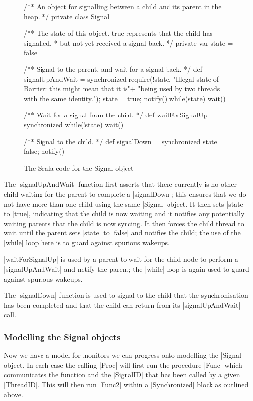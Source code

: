 \begin{figure}[H]
  \begin{scala}
  /** An object for signalling between a child and its parent in the heap. */
  private class Signal{
    /** The state of this object.  true represents that the child has signalled,
      * but not yet received a signal back. */
    private var state = false

    /** Signal to the parent, and wait for a signal back. */
    def signalUpAndWait = synchronized{
      require(!state, 
        "Illegal state of Barrier: this might mean that it is\n"+
        "being used by two threads with the same identity.");
      state = true; notify()
      while(state) wait()
    }

    /** Wait for a signal from the child. */
    def waitForSignalUp = synchronized{ while(!state) wait() }

    /** Signal to the child. */
    def signalDown = synchronized{ state = false; notify() }
  }
  \end{scala}
  \caption{The Scala code for the {\scalastyle Signal} object}
  \label{fig:Signal}
\end{figure}

The |signalUpAndWait| function first asserts that there currently is no other child waiting for the parent to complete a |signalDown|; this ensures that we do not have more than one child using the same |Signal| object. It then sets |state| to |true|, indicating that the child is now waiting and it notifies any potentially waiting parents that the child is now syncing. It then forces the child thread to wait until the parent sets |state| to |false| and notifies the child; the use of the |while| loop here is to guard against spurious wakeups.

|waitForSignalUp| is used by a parent to wait for the child node to perform a |signalUpAndWait| and notify the parent; the |while| loop is again used to guard against spurious wakeups.

The |signalDown| function is used to signal to the child that the synchronisation has been completed and that the child can return from its |signalUpAndWait| call.


\subsubsection{Modelling the Signal objects}

Now we have a model for monitors we can progress onto modelling the |Signal| object. In each case the calling |Proc| will first run the procedure |Func| which communicates the function and the |SignalID| that has been called by a given |ThreadID|. This will then run |Func2| within a |Synchronized| block as outlined above. \newpage

